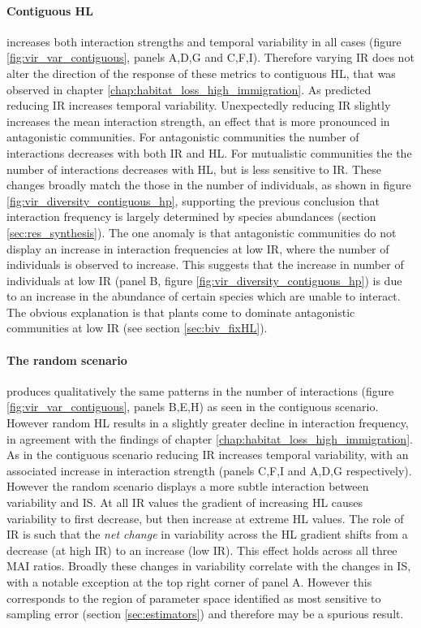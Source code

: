 \paragraph*{Contiguous HL} increases both interaction strengths and temporal variability in all cases (figure \ref{fig:vir_var_contiguous}, panels A,D,G and C,F,I). Therefore varying IR does not alter the direction of the response of these metrics to contiguous HL, that was observed in chapter \ref{chap:habitat_loss_high_immigration}. As predicted reducing IR increases temporal variability. Unexpectedly reducing IR slightly increases the mean interaction strength, an effect that is more pronounced in antagonistic communities. For antagonistic communities the number of interactions decreases with both IR and HL. For mutualistic communities the the number of interactions decreases with HL, but is less sensitive to IR. These changes broadly match the those in the number of individuals, as shown in figure \ref{fig:vir_diversity_contiguous_hp}, supporting the previous conclusion that interaction frequency is largely determined by species abundances (section \ref{sec:res_synthesis}). The one anomaly is that antagonistic communities do not display an increase in interaction frequencies at low IR, where the number of individuals is observed to increase. This suggests that the increase in number of individuals at low IR (panel B, figure \ref{fig:vir_diversity_contiguous_hp}) is due to an increase in the abundance of certain species which are unable to interact. The obvious explanation is that plants come to dominate antagonistic communities at low IR (see section \ref{sec:biv_fixHL}). 

\paragraph*{The random scenario} produces qualitatively the same patterns in the number of interactions (figure \ref{fig:vir_var_contiguous}, panels B,E,H) as seen in the contiguous scenario. However random HL results in a slightly greater decline in interaction frequency, in agreement with the findings of chapter \ref{chap:habitat_loss_high_immigration}. As in the contiguous scenario reducing IR increases temporal variability, with an associated increase in interaction strength (panels C,F,I and A,D,G respectively). However the random scenario displays a more subtle interaction between variability and IS. At all IR values the gradient of increasing HL causes variability to first decrease, but then increase at extreme HL values. The role of IR is such that the \emph{net change} in variability across the HL gradient shifts from a decrease (at high IR) to an increase (low IR). This effect holds across all three MAI ratios. Broadly these changes in variability correlate with the changes in IS, with a notable exception at the top right corner of panel A. However this corresponds to the region of parameter space identified as most sensitive to sampling error (section \ref{sec:estimators}) and therefore may be a spurious result.


